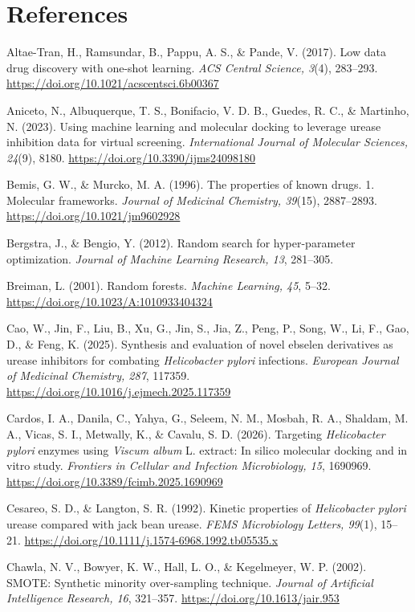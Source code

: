 \documentclass[11pt]{article}
\begin{document}
\section*{References}

Altae-Tran, H., Ramsundar, B., Pappu, A. S., \& Pande, V. (2017). Low data drug discovery with one-shot learning. \textit{ACS Central Science, 3}(4), 283--293. \url{https://doi.org/10.1021/acscentsci.6b00367}

Aniceto, N., Albuquerque, T. S., Bonifacio, V. D. B., Guedes, R. C., \& Martinho, N. (2023). Using machine learning and molecular docking to leverage urease inhibition data for virtual screening. \textit{International Journal of Molecular Sciences, 24}(9), 8180. \url{https://doi.org/10.3390/ijms24098180}

Bemis, G. W., \& Murcko, M. A. (1996). The properties of known drugs. 1. Molecular frameworks. \textit{Journal of Medicinal Chemistry, 39}(15), 2887--2893. \url{https://doi.org/10.1021/jm9602928}

Bergstra, J., \& Bengio, Y. (2012). Random search for hyper-parameter optimization. \textit{Journal of Machine Learning Research, 13}, 281--305.

Breiman, L. (2001). Random forests. \textit{Machine Learning, 45}, 5--32. \url{https://doi.org/10.1023/A:1010933404324}

Cao, W., Jin, F., Liu, B., Xu, G., Jin, S., Jia, Z., Peng, P., Song, W., Li, F., Gao, D., \& Feng, K. (2025). Synthesis and evaluation of novel ebselen derivatives as urease inhibitors for combating \textit{Helicobacter pylori} infections. \textit{European Journal of Medicinal Chemistry, 287}, 117359. \url{https://doi.org/10.1016/j.ejmech.2025.117359}

Cardos, I. A., Danila, C., Yahya, G., Seleem, N. M., Mosbah, R. A., Shaldam, M. A., Vicas, S. I., Metwally, K., \& Cavalu, S. D. (2026). Targeting \textit{Helicobacter pylori} enzymes using \textit{Viscum album} L. extract: In silico molecular docking and in vitro study. \textit{Frontiers in Cellular and Infection Microbiology, 15}, 1690969. \url{https://doi.org/10.3389/fcimb.2025.1690969}

Cesareo, S. D., \& Langton, S. R. (1992). Kinetic properties of \textit{Helicobacter pylori} urease compared with jack bean urease. \textit{FEMS Microbiology Letters, 99}(1), 15--21. \url{https://doi.org/10.1111/j.1574-6968.1992.tb05535.x}

Chawla, N. V., Bowyer, K. W., Hall, L. O., \& Kegelmeyer, W. P. (2002). SMOTE: Synthetic minority over-sampling technique. \textit{Journal of Artificial Intelligence Research, 16}, 321--357. \url{https://doi.org/10.1613/jair.953}
\end{document}
